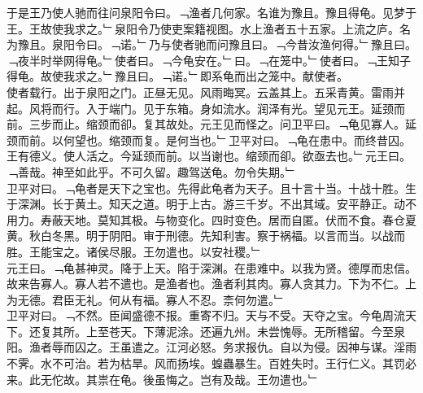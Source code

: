 \documentclass{zhvt-classic}
\begin{document}
\hspace*{2em}于是王乃使人驰而往问泉阳令曰。﹁渔者几何家。名谁为豫且。豫且得龟。见梦于王。王故使我求之。﹂泉阳令乃使吏案籍视图。水上渔者五十五家。上流之庐。名为豫且。泉阳令曰。﹁诺。﹂乃与使者驰而问豫且曰。﹁今昔汝渔何得。﹂豫且曰。﹁夜半时举网得龟。﹂使者曰。﹁今龟安在。﹂曰。﹁在笼中。﹂使者曰。﹁王知子得龟。故使我求之。﹂豫且曰。﹁诺。﹂即系龟而出之笼中。献使者。\\
\hspace*{2em}使者载行。出于泉阳之门。正昼无见。风雨晦冥。云盖其上。五采青黄。雷雨并起。风将而行。入于端门。见于东箱。身如流水。润泽有光。望见元王。延颈而前。三步而止。缩颈而卻。复其故处。元王见而怪之。问卫平曰。﹁龟见寡人。延颈而前。以何望也。缩颈而复。是何当也。﹂卫平对曰。﹁龟在患中。而终昔囚。王有德义。使人活之。今延颈而前。以当谢也。缩颈而卻。欲亟去也。﹂元王曰。﹁善哉。神至如此乎。不可久留。趣驾送龟。勿令失期。﹂\\
\hspace*{2em}卫平对曰。﹁龟者是天下之宝也。先得此龟者为天子。且十言十当。十战十胜。生于深渊。长于黄土。知天之道。明于上古。游三千岁。不出其域。安平静正。动不用力。寿蔽天地。莫知其极。与物变化。四时变色。居而自匿。伏而不食。春仓夏黄。秋白冬黑。明于阴阳。审于刑德。先知利害。察于祸福。以言而当。以战而胜。王能宝之。诸侯尽服。王勿遣也。以安社稷。﹂\\
\hspace*{2em}元王曰。﹁龟甚神灵。降于上天。陷于深渊。在患难中。以我为贤。德厚而忠信。故来告寡人。寡人若不遣也。是渔者也。渔者利其肉。寡人贪其力。下为不仁。上为无德。君臣无礼。何从有福。寡人不忍。柰何勿遣。﹂\\
\hspace*{2em}卫平对曰。﹁不然。臣闻盛德不报。重寄不归。天与不受。天夺之宝。今龟周流天下。还复其所。上至苍天。下薄泥涂。还遍九州。未尝愧辱。无所稽留。今至泉阳。渔者辱而囚之。王虽遣之。江河必怒。务求报仇。自以为侵。因神与谋。淫雨不霁。水不可治。若为枯旱。风而扬埃。蝗蟲暴生。百姓失时。王行仁义。其罚必来。此无佗故。其祟在龟。後虽悔之。岂有及哉。王勿遣也。﹂\\
\end{document}
